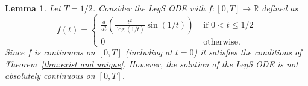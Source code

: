 \documentclass{article}
\newtheorem{lemma}{Lemma}
\theoremstyle{definition}
\newcommand{\pr}[1]{ \left( #1 \right) }
\begin{document}
\begin{lemma}
Let $T=1/2$.
Consider the LegS ODE with $f\colon[0,T]\to\mathbb{R}$ defined as
\begin{equation*}
    f(t) =
    \begin{cases}
         \frac{d}{dt} \pr{ \frac{t^2}{\log(1/t)} \sin \pr{ 1/t }}  & \text{ if } 0< t \le1/2 \\
        0 & \text{ otherwise}.
    \end{cases}
\end{equation*}
Since $f$ is continuous on $[0,T]$ (including at $t=0$) it satisfies the conditions of Theorem~\ref{thm:exist and unique}.
However, the solution of the LegS ODE is not absolutely continuous on \( [0,T] \).

\end{lemma}
\end{document}
